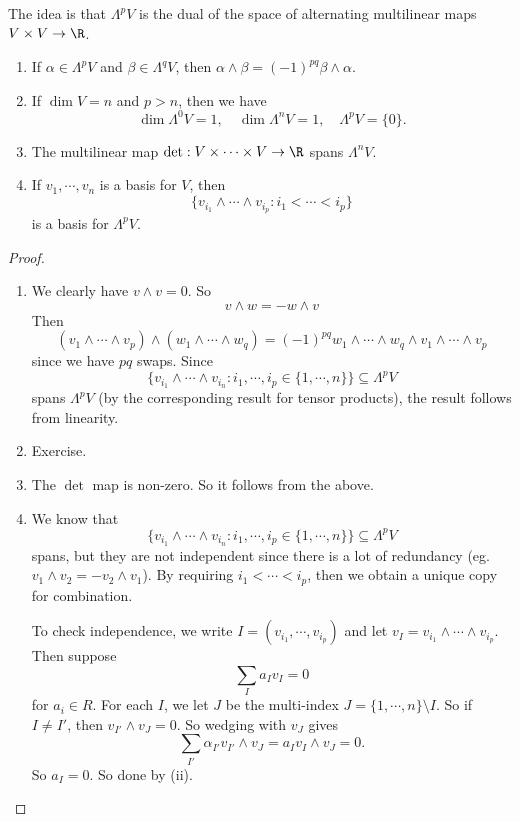 \documentclass[a4paper]{article}
\begin{document}
The idea is that $\Lambda^p V$ is the dual of the space of alternating multilinear maps $V \times V\to \R$.

\begin{lemma}\leavevmode
  \begin{enumerate}
    \item If $\alpha \in \Lambda^p V$ and $\beta \in \Lambda^q V$, then $\alpha \wedge \beta = (-1)^{pq} \beta \wedge \alpha$.
    \item If $\dim V = n$ and $p > n$, then we have
      \[
        \dim \Lambda^0 V = 1,\quad \dim \Lambda^n V = 1,\quad \Lambda^p V = \{0\}.
      \]
    \item The multilinear map $\det: V \times \cdots \times V \to \R$ spans $\Lambda^n V$.
    \item If $v_1, \cdots, v_n$ is a basis for $V$, then
      \[
        \{v_{i_1} \wedge \cdots \wedge v_{i_p}: i_1 < \cdots < i_p\}
      \]
      is a basis for $\Lambda^p V$.
  \end{enumerate}
\end{lemma}

\begin{proof}\leavevmode
  \begin{enumerate}
    \item We clearly have $v \wedge v = 0$. So
      \[
        v \wedge w = - w \wedge v
      \]
      Then
      \[
        (v_1 \wedge \cdots \wedge v_p) \wedge (w_1 \wedge \cdots \wedge w_q) = (-1)^{pq} w_1 \wedge \cdots \wedge w_q \wedge v_1 \wedge \cdots \wedge v_p
      \]
      since we have $pq$ swaps. Since
      \[
        \{v_{i_1} \wedge \cdots \wedge v_{i_n}: i_1, \cdots, i_p \in \{1,\cdots, n\}\} \subseteq \Lambda^p V
      \]
      spans $\Lambda^p V$ (by the corresponding result for tensor products), the result follows from linearity.
    \item Exercise.
    \item The $\det$ map is non-zero. So it follows from the above.
    \item We know that
      \[
        \{v_{i_1} \wedge \cdots \wedge v_{i_n}: i_1, \cdots, i_p \in \{1,\cdots, n\}\} \subseteq \Lambda^p V
      \]
      spans, but they are not independent since there is a lot of redundancy (eg. $v_1 \wedge v_2 = - v_2 \wedge v_1$). By requiring $i_1 < \cdots < i_p$, then we obtain a unique copy for combination.

      To check independence, we write $I = (v_{i_1}, \cdots, v_{i_p})$ and let $v_I = v_{i_1} \wedge \cdots \wedge v_{i_p}$. Then suppose
      \[
        \sum_I a_I v_I = 0
      \]
      for $a_i \in R$. For each $I$, we let $J$ be the multi-index $J = \{1, \cdots, n\} \setminus I$. So if $I \not= I'$, then $v_{I'} \wedge v_J = 0$. So wedging with $v_J$ gives
      \[
        \sum_{I'} \alpha_{I'} v_{I'} \wedge v_J = a_I v_I \wedge v_J = 0.
      \]
      So $a_I = 0$. So done by (ii). \qedhere
  \end{enumerate}
\end{proof}
\end{document}
